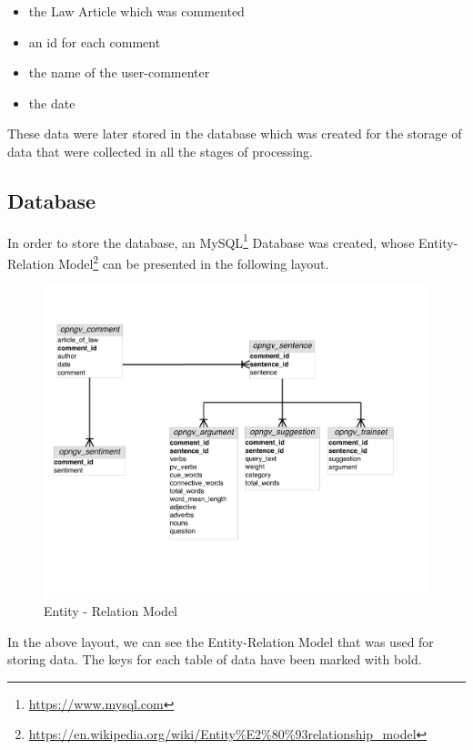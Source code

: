 \begin{itemize}

	\item the Law Article which was commented
	\item an id for each comment
	\item the name of the user-commenter
	\item the date\\

\end{itemize}

These data were later stored in the database which was created for the storage of data that were collected in all the stages of processing.

\subsection{Database}\label{314_ref}
In order to store the database, an MySQL\footnote{\url{https://www.mysql.com}} Database was created, whose Entity-Relation Model\footnote{\url{https://en.wikipedia.org/wiki/Entity\%E2\%80\%93relationship_model}} can be presented in the following layout.
\newpage
\begin{figure}[H]
\centering
\includegraphics[width=1.15\linewidth]{figure/ER.pdf}
\caption{Entity - Relation Model}
\end{figure}

In the above layout, we can see the Entity-Relation Model that was used for storing data. The keys for each table of data have been marked with bold.

